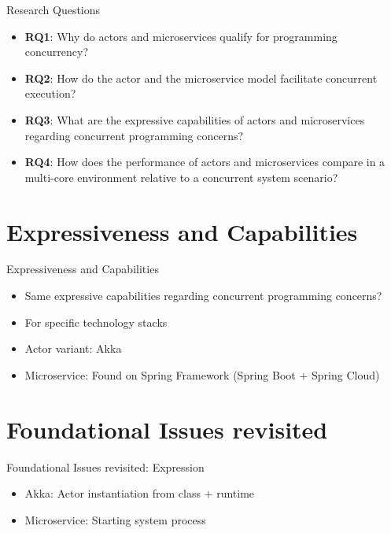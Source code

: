 \documentclass{beamer}
\begin{document}
\begin{frame}{Research Questions}

\begin{itemize}
  \item \textbf{RQ1}: Why do actors and microservices qualify for programming concurrency?
  \item \textbf{RQ2}: How do the actor and the microservice model facilitate concurrent execution?
  \item \textbf{RQ3}: What are the expressive capabilities of actors and microservices regarding concurrent programming concerns?
  \item \textbf{RQ4}: How does the performance of actors and microservices compare in a multi-core environment relative to a concurrent system scenario?
\end{itemize}

\end{frame}

\section{Expressiveness and Capabilities}


\begin{frame}{Expressiveness and Capabilities}

\begin{itemize}
  \item Same expressive capabilities regarding concurrent programming concerns?
  \item For specific technology stacks
  \item Actor variant: Akka
  \item Microservice: Found on Spring Framework (Spring Boot $+$ Spring Cloud)
\end{itemize}

\end{frame}


\section{Foundational Issues revisited}


\begin{frame}{Foundational Issues revisited: Expression}

\begin{itemize}
  \item Akka: Actor instantiation from class $+$ runtime
  \item Microservice: Starting system process
\end{itemize}

\end{frame}
\end{document}
